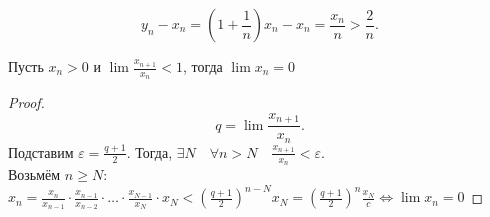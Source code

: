 \documentclass[11pt, oneside]{article}   	%
\begin{document}
\begin{dlemma}
    \[ y_n - x_n = \left(1+\frac{1}{n}\right)x_n - x_n = \frac{x_n}{n} > \frac{2}{n} .\] 
\end{dlemma}
\begin{theorem}
    Пусть $x_n>0$ и  $\lim \frac{x_{n+1}}{x_n} < 1$, тогда $\lim x_n = 0$
     \begin{proof}
         \[ q = \lim \frac{x_{n+1}}{x_n} .\] 
         Подставим $\varepsilon = \frac{q+1}{2}$. Тогда,  $\exists{N}\quad \forall{n>N}\quad \frac{x_{n+1}}{x_n} < \varepsilon$.\\
         Возьмём $n\ge N$: $x_n = \frac{x_n}{x_{n-1}}\cdot \frac{x_{n-1}}{x_{n-2}} \cdot \ldots \cdot \frac{x_{N-1}}{x_N} \cdot  x_N < \left( \frac{q+1}{2} \right)^{n-N}x_N = \left(\frac{q+1}{2}\right)^{n}\frac{x_N}{c} \iff \lim x_n = 0 $
    \end{proof}
\end{theorem}
\end{document}
